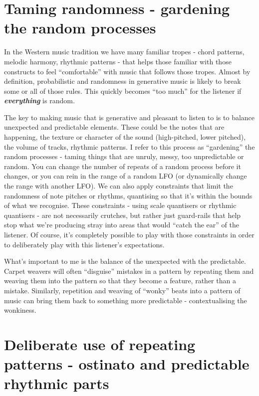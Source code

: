 \documentclass[
  12pt,
  letterpaper,
  oneside,
  open=any]{scrbook}
\begin{document}
\section{Taming randomness - gardening the random
processes}\label{taming-randomness---gardening-the-random-processes}

In the Western music tradition we have many familiar tropes - chord
patterns, melodic harmony, rhythmic patterns - that helps those familiar
with those constructs to feel ``comfortable'' with music that follows
those tropes. Almost by definition, probabilistic and randomness in
generative music is likely to break some or all of those rules. This
quickly becomes ``too much'' for the listener if
\textbf{\emph{everything}} is random.

The key to making music that is generative and pleasant to listen to is
to balance unexpected and predictable elements. These could be the notes
that are happening, the texture or character of the sound (high-pitched,
lower pitched), the volume of tracks, rhythmic patterns. I refer to this
process as ``gardening'' the random processes - taming things that are
unruly, messy, too unpredictable or random. You can change the number of
repeats of a random process before it changes, or you can rein in the
range of a random LFO (or dynamically change the range with another
LFO). We can also apply constraints that limit the randomness of note
pitches or rhythms, quantising so that it's within the bounds of what we
recognise. These constraints - using scale quantisers or rhythmic
quantisers - are not necessarily crutches, but rather just guard-rails
that help stop what we're producing stray into areas that would ``catch
the ear'' of the listener. Of course, it's completely possible to play
with those constraints in order to deliberately play with this
listener's expectations.

What's important to me is the balance of the unexpected with the
predictable. Carpet weavers will often ``disguise'' mistakes in a
pattern by repeating them and weaving them into the pattern so that they
become a feature, rather than a mistake. Similarly, repetition and
weaving of ``wonky'' beats into a pattern of music can bring them back
to something more predictable - contextualising the wonkiness.

\section{Deliberate use of repeating patterns - ostinato and predictable
rhythmic
parts}\label{deliberate-use-of-repeating-patterns---ostinato-and-predictable-rhythmic-parts}
\end{document}
